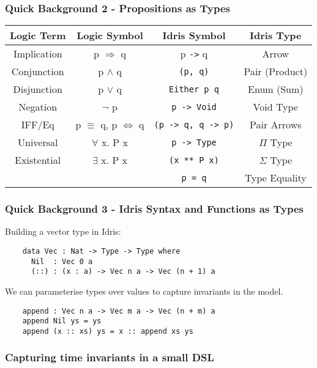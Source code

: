 \documentclass{beamer}
\begin{document}
\begin{frame}[fragile]
  \frametitle{Quick Background 2 - Propositions as Types}
     \begin{table}[h!]
    \begin{tabular}{c|c|c|c}
    \textbf{Logic Term} & \textbf{Logic Symbol} & \textbf{Idris Symbol}
      & \textbf{Idris Type} \\
    \hline
      Implication & p $\Rightarrow$ q & p \texttt{->} q
      & Arrow \\
      Conjunction & p $\land$ q & \texttt{(p, q)} 
      & Pair (Product) \\
      Disjunction & p $\lor$ q & \texttt{Either p q}
      & Enum (Sum)\\
      Negation & $\lnot$ p & \texttt{p -> Void} &
      Void Type \\
      IFF/Eq & p $\equiv$ q, p $\iff$ q & \texttt{(p -> q, q -> p)} 
      & Pair Arrows \\
      Universal & $\forall$ x. P x & 
      \texttt{p -> Type} & $\Pi$ Type \\
      Existential & $\exists$ x. P x 
      & \texttt{(x ** P x)} & $\Sigma$ Type \\
      \hline
       & & \texttt{p = q} & Type Equality
    \end{tabular}
  \end{table}
\end{frame}

\begin{frame}[fragile]
  \frametitle{Quick Background 3 - Idris Syntax and Functions as Types}
  Building a vector type in Idris: 
  \begin{verbatim}
    data Vec : Nat -> Type -> Type where
      Nil  : Vec 0 a
      (::) : (x : a) -> Vec n a -> Vec (n + 1) a
  \end{verbatim}
  We can parameterise types over values to capture invariants in the model.
  \begin{verbatim}
    append : Vec n a -> Vec m a -> Vec (n + m) a
    append Nil ys = ys
    append (x :: xs) ys = x :: append xs ys 
  \end{verbatim}
\end{frame}

\begin{frame}[fragile]
  \frametitle{Capturing time invariants in a small DSL}
\end{frame}
\end{document}
